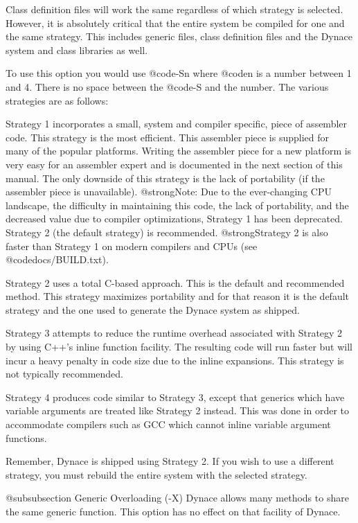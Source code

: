Class definition files will work the same regardless of which strategy
is selected.  However, it is absolutely critical that the entire system
be compiled for one and the same strategy.  This includes generic files,
class definition files and the Dynace system and class libraries as well.

To use this option you would use @code{-Sn} where @code{n} is a number
between 1 and 4.  There is no space between the @code{-S} and the number.
The various strategies are as follows:

Strategy 1 incorporates a small, system and compiler specific, piece
of assembler code.  This strategy is the most efficient.  This
assembler piece is supplied for many of the popular platforms.
Writing the assembler piece for a new platform is very easy for an
assembler expert and is documented in the next section of this manual.
The only downside of this strategy is the lack of portability (if the
assembler piece is unavailable). @strong{Note:} Due to the ever-changing
CPU landscape, the difficulty in maintaining this code, the lack of portability,
and the decreased value due to compiler optimizations, Strategy 1 has
been deprecated.  Strategy 2 (the default strategy) is recommended.
@strong{Strategy 2 is also faster than Strategy 1} on modern compilers and
CPUs (see @code{docs/BUILD.txt}).


Strategy 2 uses a total C-based approach.  This is the default and
recommended method.  This strategy maximizes portability and for that
reason it is the default strategy and the one used to generate the
Dynace system as shipped.  

Strategy 3 attempts to reduce the runtime overhead associated with
Strategy 2 by using C++'s inline function facility.  The resulting
code will run faster but will incur a heavy penalty in code size due
to the inline expansions.  This strategy is not typically recommended.

Strategy 4 produces code similar to Strategy 3, except that generics
which have variable arguments are treated like Strategy 2 instead.
This was done in order to accommodate compilers such as GCC which
cannot inline variable argument functions.

Remember, Dynace is shipped using Strategy 2.  If you wish to use a
different strategy, you must rebuild the entire system with the selected
strategy.

@subsubsection Generic Overloading (-X)
Dynace allows many methods to share the same generic function.  This
option has no effect on that facility of Dynace.

